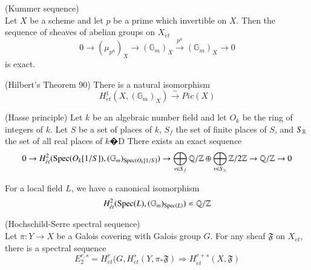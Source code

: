 \documentclass{ujarticle}
\begin{document}
\begin{prop}(Kummer sequence) \\
Let $X$ be a scheme  and let $p$ be a prime which invertible on $X$.
Then the sequence of sheaves of abelian groups on $X_{\acute{e}t}$
\begin{equation*}
 0 \rightarrow (\mu_{p^n})_X \rightarrow (\mathbb{G}_{m})_X \stackrel{p^n}{\to} (\mathbb{G}_{m})_X \rightarrow 0
\end{equation*}
is exact.
\end{prop}

\begin{prop} (Hilbert's Theorem 90)
There is a natural isomorphism
\begin{equation*}
H^1_{\acute{e}t}(X,(\mathbb{G}_{m})_X) \stackrel{\sim}{\rightarrow} Pic(X)
\end{equation*}

\end{prop}
\begin{thm} (Hasse principle)
Let $k$ be an algebraic number field and let  $O_{k}$ be the ring of integers of $k$.
Let $S$ be a set of places of $k$, $S_f$ the set of finite places of $S$, and $S_{\mathbb{R}}$  the set of all real places of $k$�D
There exists an exact sequence
\begin{equation*}
0 \rightarrow H^2_{\acute{e}t}(\mathrm{Spec}(O_k[1/S]),(\mathbb{G}_{m})_{\mathrm{Spec}(O_k[1/S]}) \rightarrow
\bigoplus\limits_{\nu \in S_{f}} \mathbb{Q}/\mathbb{Z} \oplus \bigoplus\limits_{\nu \in S_{\mathbb{R}}} \mathbb{Z}/2\mathbb{Z} \rightarrow \mathbb{Q}/\mathbb{Z} \rightarrow 0
\end{equation*}
\end{thm}

\begin{prop}
For  a local field $L$, we have a canonical isomorphism
\begin{equation*}
H^2_{\acute{e}t}(\mathrm{Spec}(L),(\mathbb{G}_{m})_{\mathrm{Spec}(L)}) \backsimeq \mathbb{Q}/\mathbb{Z}
\end{equation*}
\end{prop}

\begin{prop}(Hochschild-Serre spectral sequence)\\
Let $\pi : Y \to  X$ be a Galois covering with Galois group $G$.
For any sheaf $\mathfrak{F}$ on $X_{\acute{e}t}$, there is a spectral sequence
\begin{equation*}
E^{r,s}_2=H^r_{\acute{e}t}(G,H^s_{\acute{e}t}(Y,\pi_{*}\mathfrak{F})
\Rightarrow  H^{r+s}_{\acute{e}t}(X,\mathfrak{F})
\end{equation*}
\end{prop}
\end{document}
